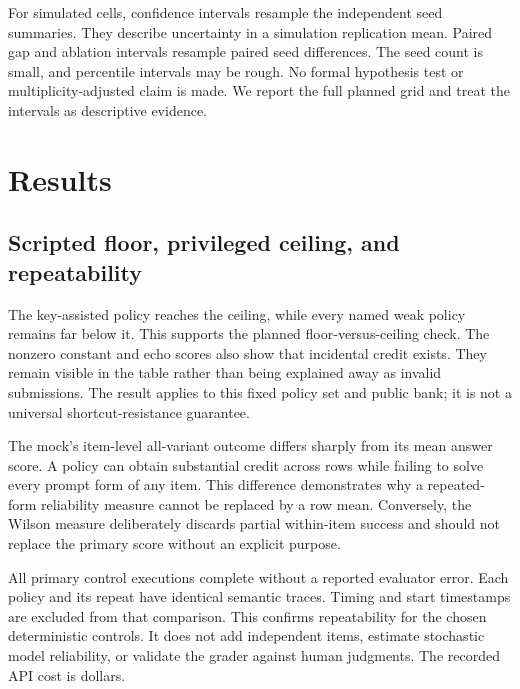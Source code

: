 \documentclass{article}
\begin{document}
For simulated cells, confidence intervals resample the \Seeds{} independent seed summaries. They describe uncertainty in a simulation replication mean. Paired gap and ablation intervals resample paired seed differences. The seed count is small, and percentile intervals may be rough. No formal hypothesis test or multiplicity-adjusted claim is made. We report the full planned grid and treat the intervals as descriptive evidence.\par
\section{Results}
\subsection{Scripted floor, privileged ceiling, and repeatability}


The key-assisted policy reaches the ceiling, while every named weak policy remains far below it. This supports the planned floor-versus-ceiling check. The nonzero constant and echo scores also show that incidental credit exists. They remain visible in the table rather than being explained away as invalid submissions. The result applies to this fixed policy set and public bank; it is not a universal shortcut-resistance guarantee.\par
The mock's item-level all-variant outcome differs sharply from its mean answer score. A policy can obtain substantial credit across rows while failing to solve every prompt form of any item. This difference demonstrates why a repeated-form reliability measure cannot be replaced by a row mean. Conversely, the Wilson measure deliberately discards partial within-item success and should not replace the primary score without an explicit purpose.\par
All \PolicyExecutions{} primary control executions complete without a reported evaluator error. Each policy and its repeat have identical semantic traces. Timing and start timestamps are excluded from that comparison. This confirms repeatability for the chosen deterministic controls. It does not add independent items, estimate stochastic model reliability, or validate the grader against human judgments. The recorded API cost is \ApiCost{} dollars.\par
\end{document}
